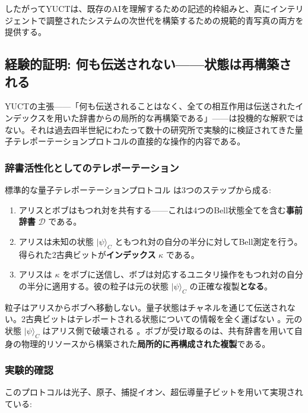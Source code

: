\documentclass[12pt,a4paper]{article}
\theoremstyle{definition}
\theoremstyle{remark}
\begin{document}
	したがってYUCTは、既存のAIを理解するための記述的枠組みと、真にインテリジェントで調整されたシステムの次世代を構築するための規範的青写真の両方を提供する。
	
	\subsection{経験的証明: 何も伝送されない——状態は再構築される}
	
	YUCTの主張——「何も伝送されることはなく、全ての相互作用は伝送されたインデックスを用いた辞書からの局所的な再構築である」——は投機的な解釈ではない。それは過去四半世紀にわたって数十の研究所で実験的に検証されてきた量子テレポーテーションプロトコルの直接的な操作的内容である。
	
	\subsubsection{辞書活性化としてのテレポーテーション}
	
	標準的な量子テレポーテーションプロトコル \cite{Bennett1993} は3つのステップから成る:
	\begin{enumerate}
		\item アリスとボブはもつれ対を共有する——これは4つのBell状態全てを含む\textbf{事前辞書} $\mathcal{D}$ である。
		\item アリスは未知の状態 $|\psi\rangle_C$ ともつれ対の自分の半分に対してBell測定を行う。得られた2古典ビットが\textbf{インデックス} $\kappa$ である。
		\item アリスは $\kappa$ をボブに送信し、ボブは対応するユニタリ操作をもつれ対の自分の半分に適用する。彼の粒子は元の状態 $|\psi\rangle_C$ の正確な複製\textbf{となる}。
	\end{enumerate}
	
	粒子はアリスからボブへ移動しない。量子状態はチャネルを通じて伝送されない。2古典ビットはテレポートされる状態についての情報を全く運ばない \cite{Pirandola2017}。元の状態 $|\psi\rangle_C$ はアリス側で破壊される \cite{Wootters1982}。ボブが受け取るのは、共有辞書を用いて自身の物理的リソースから構築された\textbf{局所的に再構成された複製}である。
	
	\subsubsection{実験的確認}
	
	このプロトコルは光子、原子、捕捉イオン、超伝導量子ビットを用いて実現されている:
	
\end{document}
